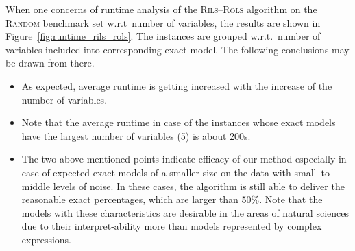 \documentclass[a4paper,12pt]{elsarticle}
\begin{document}
When one concerns of runtime analysis of the \textsc{Rils}--\textsc{Rols} algorithm on the \textsc{Random} benchmark set w.r.t\ number of variables, the results are shown in Figure~\ref{fig:runtime_rils_rols}. The instances are grouped w.r.t.\ number of variables included into corresponding exact model. The following conclusions may be drawn from there.

\begin{itemize}
	\item As expected, average runtime is getting increased with the increase of the number of variables. 
	\item Note that the average runtime in case of the instances whose exact models have the largest number of variables (5) is about 200s.
	\item The two above-mentioned points indicate efficacy of our method especially in case of expected exact models of a smaller size on the data with small--to--middle levels of noise. In these cases, the algorithm is still able to deliver the reasonable exact percentages, which are larger than 50\%. Note that 
	the models with these characteristics are desirable in the areas of natural sciences due to their interpret-ability more than models represented by complex expressions.   
\end{itemize}
\end{document}
